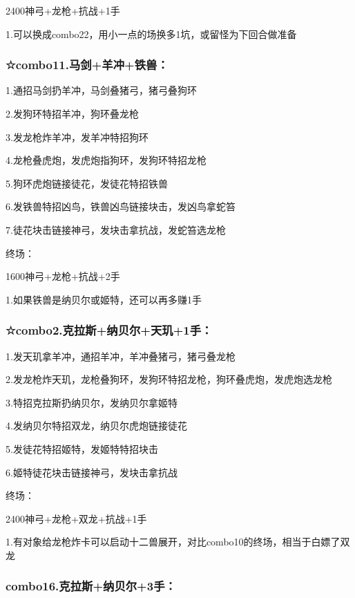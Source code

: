 \documentclass[
]{article}
\begin{document}
2400神弓+龙枪+抗战+1手

1.可以换成combo22，用小一点的场换多1坑，或留怪为下回合做准备

\hypertarget{combo11.ux9a6cux5251ux7f8aux51b2ux94c1ux517d}{%
\subsubsection{☆combo11.马剑+羊冲+铁兽：}\label{combo11.ux9a6cux5251ux7f8aux51b2ux94c1ux517d}}

1.通招马剑扔羊冲，马剑叠猪弓，猪弓叠狗环

2.发狗环特招羊冲，狗环叠龙枪

3.发龙枪炸羊冲，发羊冲特招狗环

4.龙枪叠虎炮，发虎炮指狗环，发狗环特招龙枪

5.狗环虎炮链接徒花，发徒花特招铁兽

6.发铁兽特招凶鸟，铁兽凶鸟链接块击，发凶鸟拿蛇笞

7.徒花块击链接神弓，发块击拿抗战，发蛇笞选龙枪

终场：

1600神弓+龙枪+抗战+2手

1.如果铁兽是纳贝尔或姬特，还可以再多赚1手

\hypertarget{combo2.ux514bux62c9ux65afux7eb3ux8d1dux5c14ux5929ux73911ux624b}{%
\subsubsection{☆combo2.克拉斯+纳贝尔+天玑+1手：}\label{combo2.ux514bux62c9ux65afux7eb3ux8d1dux5c14ux5929ux73911ux624b}}

1.发天玑拿羊冲，通招羊冲，羊冲叠猪弓，猪弓叠龙枪

2.发龙枪炸天玑，龙枪叠狗环，发狗环特招龙枪，狗环叠虎炮，发虎炮选龙枪

3.特招克拉斯扔纳贝尔，发纳贝尔拿姬特

4.发纳贝尔特招双龙，纳贝尔虎炮链接徒花

5.发徒花特招姬特，发姬特特招块击

6.姬特徒花块击链接神弓，发块击拿抗战

终场：

2400神弓+龙枪+双龙+抗战+1手

1.有对象给龙枪炸卡可以启动十二兽展开，对比combo10的终场，相当于白嫖了双龙

\hypertarget{combo16.ux514bux62c9ux65afux7eb3ux8d1dux5c143ux624b}{%
\subsubsection{combo16.克拉斯+纳贝尔+3手：}\label{combo16.ux514bux62c9ux65afux7eb3ux8d1dux5c143ux624b}}
\end{document}

